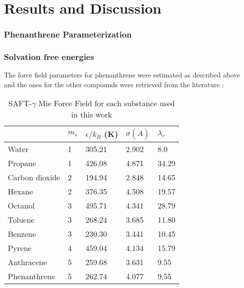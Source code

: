 \chapter{Results and Discussion} %

\label{Chapter5} %

\subsection{Phenanthrene Parameterization}


\subsection{Solvation free energies}

The force field parameters for phenanthrene were estimated as described above and the ones for the other compounds were retrieved from the literature \cite{lobanova2016,herdes2015,ervik2016,muller2017}:

\begin{table*}[h]
\center
  \caption{SAFT-$\gamma$ Mie Force Field for each substance used in this work}
  \label{tbl:parameters}
  \begin{tabular}{lllll}
  	\hline
  	               & $m_s$ & $\epsilon/k_{B}$ (K) & $\sigma (\dot{A})$ & $\lambda_r$ \\ \hline
  	Water          & 1     & 305.21               & 2.902              & 8.0         \\
  	Propane        & 1     & 426.08               & 4.871              & 34.29       \\
  	Carbon dioxide & 2     & 194.94               & 2.848              & 14.65       \\
  	Hexane         & 2     & 376.35               & 4.508              & 19.57       \\
  	Octanol        & 3     & 495.71               & 4.341              & 28.79       \\
  	Toluene        & 3     & 268.24               & 3.685              & 11.80       \\
  	Benzene        & 3     & 230.30               & 3.441              & 10.45       \\
  	Pyrene         & 4     & 459.04               & 4.134              & 15.79       \\
  	Anthracene     & 5     & 259.68               & 3.631              & 9.55        \\
  	Phenanthrene   & 5     & 262.74               & 4.077              & 9.55        \\ \hline
  \end{tabular}

\end{table*}


